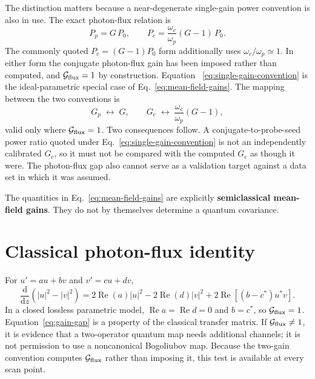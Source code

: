 \documentclass[11pt,a4paper]{article}
\newcommand{\dd}{\mathrm d}
\newcommand{\Rea}{\operatorname{Re}}
\begin{document}
The distinction matters because a near-degenerate single-gain power convention
is also in use. The exact photon-flux relation is
\begin{equation}
P_p=G\,P_0,\qquad
P_c=\frac{\omega_c}{\omega_p}(G-1)\,P_0 .
\label{eq:single-gain-convention}
\end{equation}
The commonly quoted $P_c=(G-1)P_0$ form additionally uses
$\omega_c/\omega_p\simeq1$. In either form the conjugate photon-flux gain has
been imposed rather than computed, and $\mathcal G_{\rm flux}=1$ by
construction. Equation~%
\eqref{eq:single-gain-convention} is the ideal-parametric special case of
Eq.~\eqref{eq:mean-field-gains}. The mapping between the two conventions is
\begin{equation}
G_p\;\longleftrightarrow\;G,\qquad
G_c\;\longleftrightarrow\;\frac{\omega_c}{\omega_p}(G-1) ,
\label{eq:gain-convention-map}
\end{equation}
valid only where $\mathcal G_{\rm flux}=1$. Two consequences follow. A
conjugate-to-probe-seed power ratio quoted under
Eq.~\eqref{eq:single-gain-convention} is not an independently calibrated
$G_c$, so it must not be compared with the computed $G_c$ as though it were.
The photon-flux gap also cannot serve as a validation target against a data set
in which it was assumed.

The quantities in Eq.~\eqref{eq:mean-field-gains} are explicitly
\textbf{semiclassical mean-field gains}. They do not by themselves determine
a quantum covariance.

\section{Classical photon-flux identity}

For $u'=au+bv$ and $v'=cu+dv$,
\begin{equation}
\frac{\dd}{\dd z}(|u|^2-|v|^2)
=2\Rea(a)|u|^2-2\Rea(d)|v|^2
+2\Rea[(b-c^*)u^*v].
\label{eq:gain-gap}
\end{equation}
In a closed lossless parametric model,
$\Rea a=\Rea d=0$ and $b=c^*$, so $\mathcal G_{\rm flux}=1$.
Equation~\eqref{eq:gain-gap} is a property of the classical transfer matrix.
If $\mathcal G_{\rm flux}\ne1$, it is evidence that a two-operator quantum
map needs additional channels; it is not permission to use a noncanonical
Bogoliubov map. Because the two-gain convention computes
$\mathcal G_{\rm flux}$ rather than imposing it, this test is available at
every scan point.

\end{document}
